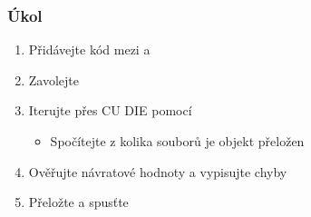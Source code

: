 \begin{frame}
  \frametitle{Úkol}

  \begin{enumerate}
    \item Přidávejte kód mezi  a 
    \item Zavolejte 
    \item Iterujte přes CU DIE pomocí 
    \begin{itemize}
      \item Spočítejte z kolika souborů je objekt přeložen
    \end{itemize}
    \item Ověřujte návratové hodnoty a vypisujte chyby
    \item Přeložte a spusťte
  \end{enumerate}

\end{frame}

